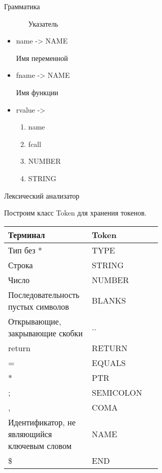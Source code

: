 \begin{para}{Грамматика}
\begin{itemize}
\begin{enumerate}
			Указатель
		
		\end{enumerate}
		
	\item name -> NAME
	
	Имя переменной
	
	\item fname -> NAME
	
	Имя функции
	
	\item rvalue ->
	
		\begin{enumerate}
		
			\item name
			
			\item fcall
			
			\item NUMBER
			
			\item STRING
		
		\end{enumerate}			
	

\end{itemize}


\end{para}

\newpage

\begin{para}{Лексический анализатор}

Построим класс Token для хранения токенов.

\begin{table}[h]

\begin{center}

\begin{tabular}{|p{0.2\linewidth}|p{0.4\linewidth}|} 

\hline
\textbf{Терминал} & \textbf{Token}\\
\hline
Тип без * & TYPE\\
\hline
Строка & STRING\\
\hline
Число & NUMBER\\
\hline
Последовательность пустых символов & BLANKS\\
\hline
Открывающие, закрывающие скобки & ..\\
\hline
return & RETURN\\
\hline
= & EQUALS\\
\hline
* & PTR\\
\hline
; & SEMICOLON\\
\hline
, & COMA\\
\hline
Идентификатор, не являющийся ключевым словом & NAME\\
\hline
\$ & END\\
\hline

\end{tabular}

\end{center}

\end{table}

\end{para}


